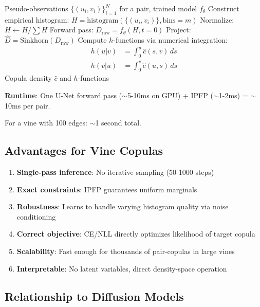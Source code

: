 \documentclass[11pt]{article}
\begin{document}
\begin{algorithm}[H]
\caption{Single-Pass Copula Density Estimation}
\begin{algorithmic}[1]
\REQUIRE Pseudo-observations $\{(u_i, v_i)\}_{i=1}^N$ for a pair, trained model $f_\theta$
\STATE Construct empirical histogram: $H = \text{histogram}(\{(u_i, v_i)\}, \text{bins}=m)$
\STATE Normalize: $H \gets H / \sum H$
\STATE Forward pass: $D_{\text{raw}} = f_\theta(H, t=0)$ 
\STATE Project: $\hat{D} = \text{Sinkhorn}(D_{\text{raw}})$
\STATE Compute $h$-functions via numerical integration:
\begin{align*}
h(u|v) &= \int_0^u \hat{c}(s, v) \, ds \\
h(v|u) &= \int_0^v \hat{c}(u, s) \, ds
\end{align*}
\RETURN Copula density $\hat{c}$ and $h$-functions
\end{algorithmic}
\end{algorithm}

\textbf{Runtime}: One U-Net forward pass ($\sim$5-10ms on GPU) + IPFP ($\sim$1-2ms) = $\sim$10ms per pair.

For a vine with 100 edges: $\sim$1 second total.

\subsection{Advantages for Vine Copulas}

\begin{enumerate}
    \item \textbf{Single-pass inference}: No iterative sampling (50-1000 steps)
    \item \textbf{Exact constraints}: IPFP guarantees uniform marginals
    \item \textbf{Robustness}: Learns to handle varying histogram quality via noise conditioning
    \item \textbf{Correct objective}: CE/NLL directly optimizes likelihood of target copula
    \item \textbf{Scalability}: Fast enough for thousands of pair-copulas in large vines
    \item \textbf{Interpretable}: No latent variables, direct density-space operation
\end{enumerate}

\subsection{Relationship to Diffusion Models}
\end{document}

